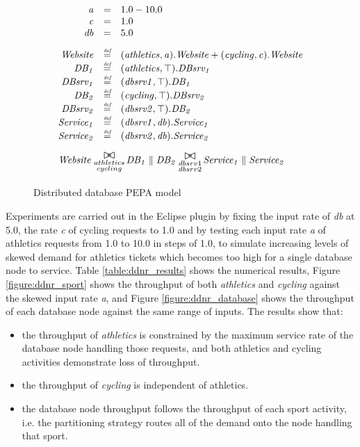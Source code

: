 \begin{figure}
	\caption{Distributed database PEPA model}
	\label{figure:pepa_ddnr_model}
	\centering
	\begin{displaymath}
	\begin{array}{rcl}
	\mathit{a} & = & 1.0-10.0\\
	\mathit{c} & = & 1.0\\
	\mathit{db} & = & 5.0\\
	[2.0ex]		\mathit{Website} & \rmdef & (\mathit{athletics},\mathit{a}).\mathit{Website}+(\mathit{cycling},\mathit{c}).\mathit{Website}\\
	\mathit{DB_1} & \rmdef & (\mathit{athletics},\top).\mathit{DBsrv_1}\\
	\mathit{DBsrv_1} & \rmdef & (\mathit{dbsrv1},\top).\mathit{DB_1}\\
	\mathit{DB_2} & \rmdef & (\mathit{cycling},\top).\mathit{DBsrv_2}\\
	\mathit{DBsrv_2} & \rmdef & (\mathit{dbsrv2},\top).\mathit{DB_2}\\
	\mathit{Service_1} & \rmdef & (\mathit{dbsrv1},\mathit{db}).\mathit{Service_1}\\
	\mathit{Service_2} & \rmdef & (\mathit{dbsrv2},\mathit{db}).\mathit{Service_2}\\
	[2.0ex]		\multicolumn{3}{l}{\mathit{Website}\sync{\substack{athletics\\cycling}}\mathit{DB_1}\parallel\mathit{DB_2}\sync{\substack{dbsrv1\\dbsrv2}}\mathit{Service_1}\parallel\mathit{Service_2}}\\
	[2.0ex]	\end{array}
	\end{displaymath}
\end{figure}

\FloatBarrier
Experiments are carried out in the Eclipse plugin by fixing the input rate of {\itshape db} at 5.0, the rate {\itshape c} of cycling requests to 1.0 and by testing each input rate {\itshape a} of athletics requests from 1.0 to 10.0 in steps of 1.0, to simulate increasing levels of skewed demand for athletics tickets which becomes too high for a single database node to service.  Table \ref{table:ddnr_results} shows the numerical results, Figure \ref{figure:ddnr_sport} shows the throughput of both {\itshape athletics} and {\itshape cycling} against the skewed input rate {\itshape a}, and Figure \ref{figure:ddnr_database} shows the throughput of each database node against the same range of inputs.
The results show that:
\begin{itemize}
	\item the throughput of {\itshape athletics} is constrained by the maximum service rate of the database node handling those requests, and both athletics and cycling activities demonstrate loss of throughput.
	\item the throughput of {\itshape cycling} is independent of athletics.
	\item the database node throughput follows the throughput of each sport activity, i.e. the partitioning strategy routes all of the demand onto the node handling that sport.
\end{itemize}

